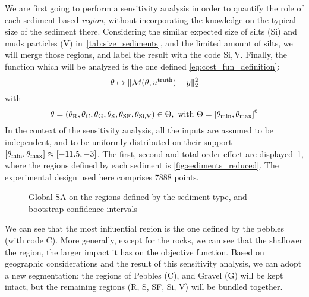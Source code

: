 \documentclass[../../Main_ManuscritThese.tex]{subfiles}
\newcommand\imgpath{/home/victor/acadwriting/Manuscrit/Text/Chapter5/img/}
\begin{document}
We are first going to perform a sensitivity analysis in order to
quantify the role of each sediment-based \emph{region}, without
incorporating the knowledge on the typical size of the sediment there.
Considering the similar expected size of silts (Si) and muds particles
(V) in~\cref{tab:size_sediments}, and the limited amount of silts, we
will merge those regions, and label the result with the code
$\mathrm{Si,V}$. Finally, the function which will be analyzed is the one
defined \cref{eq:cost_fun_definition}:
\begin{equation}
\theta \mapsto \|\mathcal{M}(\theta, u^{\mathrm{truth}}) - y \|_2^2
\end{equation}
with
\begin{equation}
  \kk = (\kk_{\mathrm{R}},\kk_{\mathrm{C}},\kk_{\mathrm{G}},\kk_{\mathrm{S}},
  \kk_{\mathrm{SF}},\kk_{\mathrm{Si,V}})\in\Kspace, \text{ with }
  \Kspace = \interval{\kk_{\min}}{\kk_{\max}}^6
\end{equation}
In the context of the sensitivity analysis, all the inputs are assumed
to be independent, and to be uniformly distributed on their support $\interval{\kk_{\min}}{\kk_{\max}}\approx \interval{\num{-11.5}}{\num{-3}}$.
The first, second and total order effect are
displayed~\cref{fig:SA_sediments}, where the regions defined by each
sediment is \cref{fig:sediments_reduced}. The experimental design used
here comprises \num{7888} points.

\label{ssec:SA_sediments}
\begin{figure}[ht]
  \centering
  
  \caption[SA on the sediments-based regions]{\label{fig:SA_sediments} Global SA on the regions defined by the sediment type, and bootstrap confidence intervals}
\end{figure}

We can see that the most influential region is the one defined by the
pebbles (with code C). More generally, except for the rocks, we can
see that the shallower the region, the larger impact it has on the
objective function.  Based on geographic considerations and the result
of this sensitivity analysis, we can adopt a new segmentation: the
regions of Pebbles (C), and Gravel (G) will be kept intact, but the
remaining regions (R, S, SF, Si, V) will be bundled together.
\end{document}
